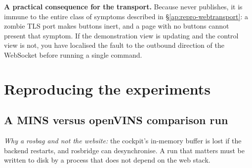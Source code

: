 \noindent\textbf{A practical consequence for the transport.} Because
 never publishes, it is immune to the entire class of
symptoms described in \S\ref{ap:repro-webtransport}: a zombie TLS port makes
buttons inert, and a page with no buttons cannot present that symptom. If the
demonstration view is updating and the control view is not, you have localised
the fault to the outbound direction of the WebSocket before running a single
command.

\section{Reproducing the experiments}
\label{ap:repro-exp}
\subsection{A MINS versus openVINS comparison run}
\label{ap:repro-comprun}
\emph{Why a rosbag and not the website:} the cockpit's in-memory buffer is lost
if the backend restarts, and rosbridge can desynchronise. A run that matters
must be written to disk by a process that does not depend on the web stack.


